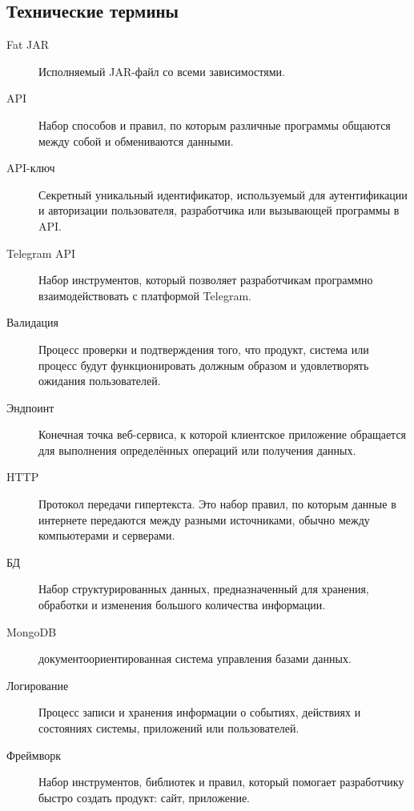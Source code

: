 \documentclass[areasetadvanced]{scrartcl}
\begin{document}
\subsection{Технические термины}
\begin{description}
\item[Fat JAR] Исполняемый JAR-файл со всеми зависимостями.
\item[API] Набор способов и правил, по которым различные программы
  общаются между собой и обмениваются данными.
\item[API-ключ] Секретный уникальный идентификатор, используемый для
  аутентификации и авторизации пользователя, разработчика или
  вызывающей программы в API.
\item[Telegram API] Набор инструментов, который позволяет
  разработчикам программно взаимодействовать с платформой Telegram.
\item[Валидация] Процесс проверки и подтверждения того, что продукт,
  система или процесс будут функционировать должным образом и
  удовлетворять ожидания пользователей.
\item[Эндпоинт] Конечная точка веб-сервиса, к которой клиентское
  приложение обращается для выполнения определённых операций или
  получения данных.
\item[HTTP] Протокол передачи гипертекста. Это набор правил, по
  которым данные в интернете передаются между разными источниками,
  обычно между компьютерами и серверами.
\item[БД] Набор структурированных данных, предназначенный для
  хранения, обработки и изменения большого количества информации.
\item[MongoDB] документоориентированная система управления базами данных.
\item[Логирование] Процесс записи и хранения информации о событиях,
  действиях и состояниях системы, приложений или пользователей.
\item[Фреймворк] Набор инструментов, библиотек и правил, который
  помогает разработчику быстро создать продукт: сайт, приложение.
\end{description}
\end{document}
